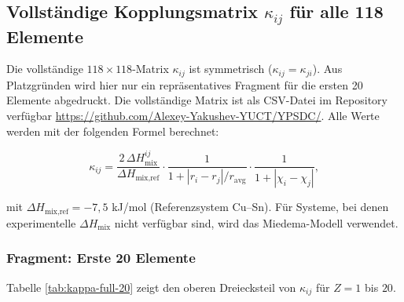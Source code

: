 \documentclass[12pt,a4paper]{article}
\begin{document}

\subsection{Vollständige Kopplungsmatrix \(\kappa_{ij}\) für alle 118 Elemente}
\label{subsec:full-kappa}

Die vollständige \(118\times118\)-Matrix \(\kappa_{ij}\) ist symmetrisch (\(\kappa_{ij}=\kappa_{ji}\)). Aus Platzgründen wird hier nur ein repräsentatives Fragment für die ersten 20 Elemente abgedruckt. Die vollständige Matrix ist als CSV-Datei im Repository verfügbar \url{https://github.com/Alexey-Yakushev-YUCT/YPSDC/}. Alle Werte werden mit der folgenden Formel berechnet:

\[
\kappa_{ij} = \frac{2\,\Delta H_{\text{mix}}^{ij}}{\Delta H_{\text{mix,ref}}} \cdot
\frac{1}{1 + |r_i - r_j|/r_{\text{avg}}} \cdot
\frac{1}{1 + |\chi_i - \chi_j|},
\]

mit \(\Delta H_{\text{mix,ref}} = -7,5\) kJ/mol (Referenzsystem Cu–Sn). Für Systeme, bei denen experimentelle \(\Delta H_{\text{mix}}\) nicht verfügbar sind, wird das Miedema-Modell \cite{Miedema1980} verwendet.

\subsubsection*{Fragment: Erste 20 Elemente}
Tabelle \ref{tab:kappa-full-20} zeigt den oberen Dreiecksteil von \(\kappa_{ij}\) für \(Z=1\) bis \(20\).
\end{document}
